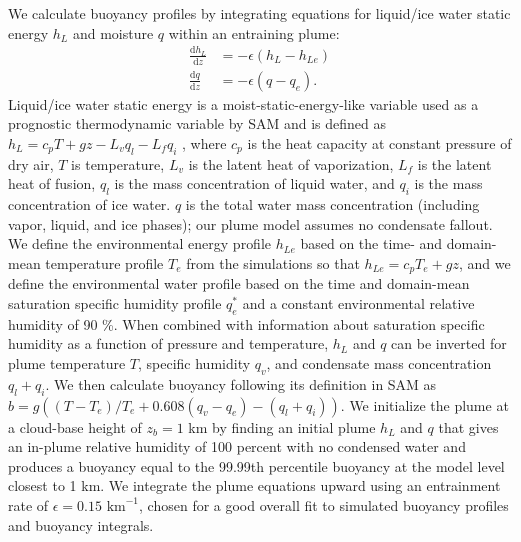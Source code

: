 \documentclass[twocol]{ametsoc}
\begin{document}
We calculate buoyancy profiles by integrating equations for liquid/ice water static energy $h_L$ and moisture $q$ within an entraining plume:
\begin{align}
    \frac{\mathrm{d} h_L}{\mathrm{d}z} &= - \epsilon (h_L - h_{Le}) \\
    \frac{\mathrm{d} q}{\mathrm{d}z} &= - \epsilon (q - q_e).
\end{align}
Liquid/ice water static energy is a moist-static-energy-like variable used as a prognostic thermodynamic variable by SAM and is defined as $h_L = c_p T + g z - L_v q_l - L_f q_i$ \citep{Khairoutdinov2003CloudSensitivities}, where $c_p$ is the heat capacity at constant pressure of dry air, $T$ is temperature, $L_v$ is the latent heat of vaporization, $L_f$ is the latent heat of fusion, $q_l$ is the mass concentration of liquid water, and $q_i$ is the mass concentration of ice water. $q$ is the total water mass concentration (including vapor, liquid, and ice phases); our plume model assumes no condensate fallout. We define the environmental energy profile $h_{Le}$ based on the time- and domain-mean temperature profile $T_e$ from the simulations so that $h_{Le} = c_p T_e + gz$, and we define the environmental water profile based on the time and domain-mean saturation specific humidity profile $q^*_e$ and a constant environmental relative humidity of 90 \%. When combined with information about saturation specific humidity as a function of pressure and temperature, $h_L$ and $q$ can be inverted for plume temperature $T$, specific humidity $q_v$, and condensate mass concentration $q_l + q_i$. We then calculate buoyancy following its definition in SAM as $b = g \left ( (T - T_e)/T_e + 0.608 (q_v - q_e) - (q_l + q_i) \right )$. We initialize the plume at a cloud-base height of $z_b = 1$ km by finding an initial plume $h_L$ and $q$ that gives an in-plume relative humidity of 100 percent with no condensed water and produces a buoyancy equal to the 99.99th percentile buoyancy at the model level closest to 1 km. We integrate the plume equations upward using an entrainment rate of $\epsilon = 0.15 \textrm{ km}^{-1}$, chosen for a good overall fit to simulated buoyancy profiles and buoyancy integrals.
\end{document}
